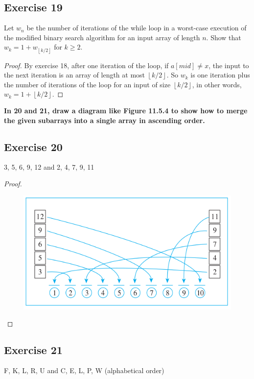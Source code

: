 \documentclass[14pt]{extarticle}
\newcommand{\cy}{\color{cyan}}
\newcommand{\floor}[1]{{\left\lfloor#1\right\rfloor}}
\begin{document}
\subsection{Exercise 19}
Let \(w_n\) be the number of iterations of the while loop in a worst-case execution of the modified binary search algorithm
for an input array of length \(n\). Show that \(w_k = 1 + w_{\floor{k/2}}\) for \(k \geq 2\).

\begin{proof}
    By exercise 18, after one iteration of the loop, if \(a[mid] \neq x\), the input to the next iteration is an array of
    length at most \(\floor{k/2}\). So \(w_k\) is one iteration plus the number of iterations of the loop for an input of size
    \(\floor{k/2}\), in other words, \(w_k = 1 + \floor{k/2}\).
\end{proof}

{\bf \cy In 20 and 21, draw a diagram like Figure 11.5.4 to show how to merge the given subarrays into a single array in
ascending order.}

\subsection{Exercise 20}
3, 5, 6, 9, 12 and 2, 4, 7, 9, 11

\begin{proof}
    \begin{figure}[ht!]
        \centering
        \includegraphics[scale=0.5]{../images/11.5.20.png}
    \end{figure}
\end{proof}

\subsection{Exercise 21}
F, K, L, R, U and C, E, L, P, W (alphabetical order)
\end{document}
